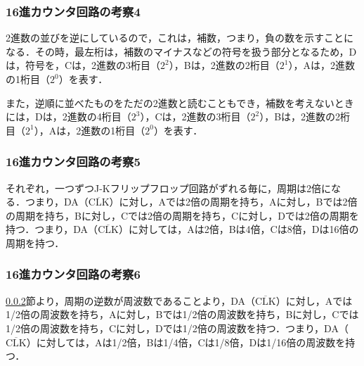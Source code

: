 %
%
\subsubsection{16進カウンタ回路の考察4}
\label{16counter_consideration4}
2進数の並びを逆にしているので，これは，補数，つまり，負の数を示すことになる．その時，最左桁は，補数のマイナスなどの符号を扱う部分となるため，Dは，符号を，Cは，2進数の3桁目（$2^2$），Bは，2進数の2桁目（$2^1$），Aは，2進数の1桁目（$2^0$）を表す．

また，逆順に並べたものをただの2進数と読むこともでき，補数を考えないときには，Dは，2進数の4桁目（$2^3$），Cは，2進数の3桁目（$2^2$），Bは，2進数の2桁目（$2^1$），Aは，2進数の1桁目（$2^0$）を表す．
%
%
\subsubsection{16進カウンタ回路の考察5}
\label{16counter_consideration5}
それぞれ，一つずつJ-Kフリップフロップ回路がずれる毎に，周期は2倍になる．つまり，DA（$\overline{\mathrm{CLK}}$）に対し，Aでは2倍の周期を持ち，Aに対し，Bでは2倍の周期を持ち，Bに対し，Cでは2倍の周期を持ち，Cに対し，Dでは2倍の周期を持つ．つまり，DA（$\overline{\mathrm{CLK}}$）に対しては，Aは2倍，Bは4倍，Cは8倍，Dは16倍の周期を持つ．

%
%
\subsubsection{16進カウンタ回路の考察6}
\label{16counter_consideration6}
\ref{16counter_consideration5}節より，周期の逆数が周波数であることより，DA（$\overline{\mathrm{CLK}}$）に対し，Aでは1/2倍の周波数を持ち，Aに対し，Bでは1/2倍の周波数を持ち，Bに対し，Cでは1/2倍の周波数を持ち，Cに対し，Dでは1/2倍の周波数を持つ．つまり，DA（$\overline{\mathrm{CLK}}$）に対しては，Aは1/2倍，Bは1/4倍，Cは1/8倍，Dは1/16倍の周波数を持つ．


